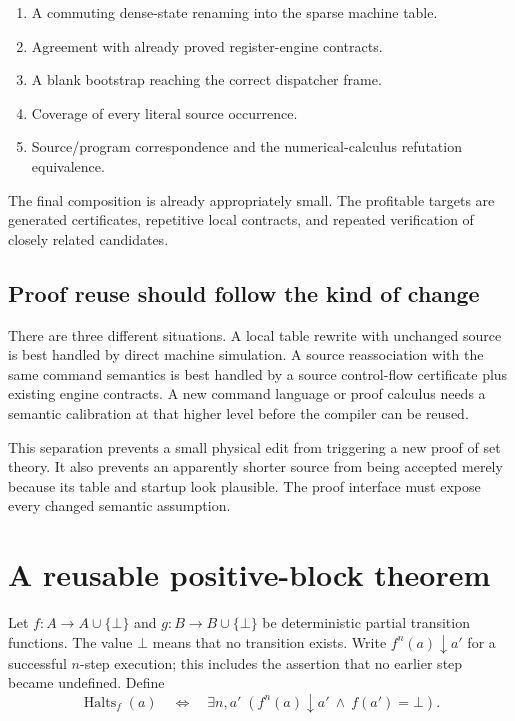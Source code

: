 \documentclass[11pt,letterpaper]{article}
\theoremstyle{definition}
\newcommand{\Halts}{\operatorname{Halts}}
\begin{document}
\begin{enumerate}
\item A commuting dense-state renaming into the sparse machine table.
\item Agreement with already proved register-engine contracts.
\item A blank bootstrap reaching the correct dispatcher frame.
\item Coverage of every literal source occurrence.
\item Source/program correspondence and the numerical-calculus
      refutation equivalence.
\end{enumerate}

The final composition is already appropriately small. The profitable
targets are generated certificates, repetitive local contracts, and
repeated verification of closely related candidates.\cite{endpoint}

\subsection{Proof reuse should follow the kind of change}

There are three different situations. A local table rewrite with unchanged
source is best handled by direct machine simulation. A source reassociation
with the same command semantics is best handled by a source control-flow
certificate plus existing engine contracts. A new command language or
proof calculus needs a semantic calibration at that higher level before
the compiler can be reused.

This separation prevents a small physical edit from triggering a new proof
of set theory. It also prevents an apparently shorter source from being
accepted merely because its table and startup look plausible. The proof
interface must expose every changed semantic assumption.

\section{A reusable positive-block theorem}\label{sec:positive}

Let $f:A\to A\cup\{\bot\}$ and $g:B\to B\cup\{\bot\}$ be deterministic
partial transition functions. The value $\bot$ means that no transition
exists. Write $f^n(a)\downarrow a'$ for a successful $n$-step execution;
this includes the assertion that no earlier step became undefined. Define
\[
 \Halts_f(a)\quad\Longleftrightarrow\quad
 \exists n,a'\;(f^n(a)\downarrow a'\ \land\ f(a')=\bot).
\]
\end{document}
